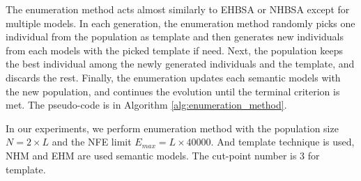 The enumeration method acts almost similarly to EHBSA or NHBSA except for multiple models. In each generation, the enumeration method randomly picks one individual from the population as template and then generates new individuals from each models with the picked template if need. Next, the population keeps the best individual among the newly generated individuals and the template, and discards the rest. Finally, the enumeration updates each semantic models with the new population, and continues the evolution until the terminal criterion is met. The pseudo-code is in Algorithm \ref{alg:enumeration_method}. 


In our experiments, we perform enumeration method with the population size $N = 2 \times L$ and the NFE limit $E_{max} = L \times 40000$. And template technique is used, NHM and EHM are used semantic models. The cut-point number is 3 for template.



